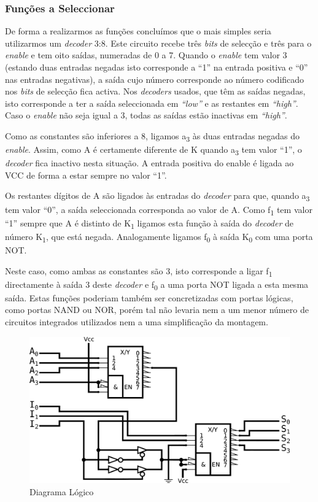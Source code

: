 \documentclass[a4paper,12pt]{article}
\begin{document}
\subsubsection{Funções a Seleccionar}
De forma a realizarmos as funções concluímos que o mais simples seria utilizarmos um {\it decoder} 3:8. Este circuito recebe três {\it bits} de selecção e três para o {\it enable} e tem oito saídas, numeradas de 0 a 7. Quando o {\it enable} tem valor 3 (estando duas entradas negadas isto corresponde a ``1'' na entrada positiva e ``0'' nas entradas negativas), a saída cujo número corresponde ao número codificado nos {\it bits} de selecção fica activa. Nos {\it decoders} usados, que têm as saídas negadas, isto corresponde a ter a saída seleccionada em {\it ``low''} e as restantes em {\it ``high''}. Caso o {\it enable} não seja igual a 3, todas as saídas estão inactivas em  {\it ``high''}.
\par
Como as constantes são inferiores a 8, ligamos a\textsubscript{3} às duas entradas negadas do {\it enable}. Assim, como A é certamente diferente de K quando a\textsubscript{3} tem valor ``1'', o {\it decoder} fica inactivo nesta situação. A entrada positiva do enable é ligada ao VCC de forma a estar sempre no valor ``1''. 
\par
Os restantes dígitos de A são ligados às entradas do {\it decoder} para que, quando a\textsubscript{3} tem valor ``0'', a saída seleccionada corresponda ao valor de A. Como f\textsubscript{1} tem valor ``1''  sempre que A é distinto de K\textsubscript{1} ligamos esta função à saída do {\it decoder} de número K\textsubscript{1}, que está negada. Analogamente ligamos f\textsubscript{0} à saída K\textsubscript{0} com uma porta NOT.
\par
Neste caso, como ambas as constantes são 3, isto corresponde a ligar 
f\textsubscript{1} directamente à saída 3 deste {\it decoder} e 
f\textsubscript{0} a uma porta NOT ligada a esta mesma saída. Estas funções 
poderiam também ser concretizadas com portas lógicas, como portas NAND ou 
NOR, porém tal não levaria nem a um menor número de circuitos integrados 
utilizados nem a uma simplificação da montagem.
\par

\begin{figure}
\centering
\includegraphics[scale=.1]{logigrama.eps}
\caption{Diagrama Lógico}
\end{figure}
\par
\par
\end{document}
